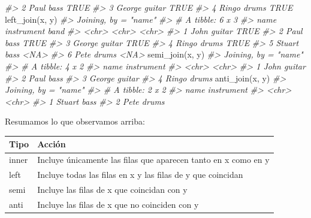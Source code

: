 \documentclass[
]{book}
\newenvironment{Shaded}{\begin{snugshade}}{\end{snugshade}}
\newcommand{\CommentTok}[1]{\textcolor[rgb]{0.56,0.35,0.01}{\textit{#1}}}
\newcommand{\FunctionTok}[1]{\textcolor[rgb]{0.00,0.00,0.00}{#1}}
\newcommand{\NormalTok}[1]{#1}
\begin{document}
\begin{Shaded}
\begin{Highlighting}[]
\CommentTok{\#\textgreater{} 2 Paul   bass       TRUE }
\CommentTok{\#\textgreater{} 3 George guitar     TRUE }
\CommentTok{\#\textgreater{} 4 Ringo  drums      TRUE}
\FunctionTok{left\_join}\NormalTok{(x, y)}
\CommentTok{\#\textgreater{} Joining, by = "name"}
\CommentTok{\#\textgreater{} \# A tibble: 6 x 3}
\CommentTok{\#\textgreater{}   name   instrument band }
\CommentTok{\#\textgreater{}   \textless{}chr\textgreater{}  \textless{}chr\textgreater{}      \textless{}chr\textgreater{}}
\CommentTok{\#\textgreater{} 1 John   guitar     TRUE }
\CommentTok{\#\textgreater{} 2 Paul   bass       TRUE }
\CommentTok{\#\textgreater{} 3 George guitar     TRUE }
\CommentTok{\#\textgreater{} 4 Ringo  drums      TRUE }
\CommentTok{\#\textgreater{} 5 Stuart bass       \textless{}NA\textgreater{} }
\CommentTok{\#\textgreater{} 6 Pete   drums      \textless{}NA\textgreater{}}
\FunctionTok{semi\_join}\NormalTok{(x, y)}
\CommentTok{\#\textgreater{} Joining, by = "name"}
\CommentTok{\#\textgreater{} \# A tibble: 4 x 2}
\CommentTok{\#\textgreater{}   name   instrument}
\CommentTok{\#\textgreater{}   \textless{}chr\textgreater{}  \textless{}chr\textgreater{}     }
\CommentTok{\#\textgreater{} 1 John   guitar    }
\CommentTok{\#\textgreater{} 2 Paul   bass      }
\CommentTok{\#\textgreater{} 3 George guitar    }
\CommentTok{\#\textgreater{} 4 Ringo  drums}
\FunctionTok{anti\_join}\NormalTok{(x, y)}
\CommentTok{\#\textgreater{} Joining, by = "name"}
\CommentTok{\#\textgreater{} \# A tibble: 2 x 2}
\CommentTok{\#\textgreater{}   name   instrument}
\CommentTok{\#\textgreater{}   \textless{}chr\textgreater{}  \textless{}chr\textgreater{}     }
\CommentTok{\#\textgreater{} 1 Stuart bass      }
\CommentTok{\#\textgreater{} 2 Pete   drums}
\end{Highlighting}
\end{Shaded}

Resumamos lo que observamos arriba:

\begin{longtable}[]{@{}ll@{}}
\toprule()
Tipo & Acción \\
\midrule()
\endhead
inner & Incluye únicamente las filas que aparecen tanto en x como en y \\
left & Incluye todas las filas en x y las filas de y que coincidan \\
semi & Incluye las filas de x que coincidan con y \\
anti & Incluye las filas de x que no coinciden con y \\
\bottomrule()
\end{longtable}
\end{document}
